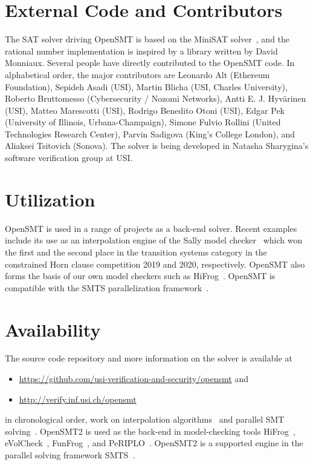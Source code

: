 \documentclass{easychair}
\begin{document}
\section{External Code and Contributors}

The SAT solver driving OpenSMT is based on the MiniSAT
solver~\cite{EenS:SAT03}, and the rational number implementation is
inspired by a library written by David Monniaux.  Several people have
directly contributed to the OpenSMT code.  In alphabetical order, the
major contributors are
%
Leonardo Alt (Ethereum Foundation),
Sepideh Asadi (USI),
Martin Blicha (USI, Charles University),
Roberto Bruttomesso (Cybersecurity / Nozomi Networks),
Antti E. J. Hyv{\"a}rinen (USI),
Matteo Marescotti (USI),
Rodrigo Benedito Otoni (USI),
Edgar Pek (University of Illinois, Urbana-Champaign),
Simone Fulvio Rollini (United Technologies Research Center),
Parvin Sadigova (King's College London), and
Aliaksei Tsitovich (Sonova).
%
The solver is being developed in Natasha Sharygina's software
verification group at USI.

\section{Utilization}

OpenSMT is used in a range of projects as a back-end solver.  Recent
examples include its use as an interpolation engine of the Sally model
checker~\cite{JovanovicD:FMCAD16} which won the first and the second place in the transition systems
category in the constrained Horn clause competition 2019 and 2020, respectively.  OpenSMT also
forms the basis of our own model checkers such as
HiFrog~\cite{AltACMFHS17}.  OpenSMT is compatible with the SMTS
parallelization framework~\cite{MarescottiHS18}.

\section{Availability}
The source code repository and more information on the solver is
available at

\begin{itemize}
    \item \url{https://github.com/usi-verification-and-security/opensmt}
        and
    \item \url{http://verify.inf.usi.ch/opensmt}
\end{itemize}

\iffalse
in chronological order, work on interpolation 
algorithms~\cite{BlichaHKS19,AltHAS17,JancikAFHKS16,AsadiBFHESC18}
and parallel SMT 
solving~\cite{HyvarinenMSCS18,MarescottiHS18,HyvarinenMS:SAT15}.
OpenSMT2 is
used as the back-end in model-checking tools
HiFrog~\cite{AltACMFHS17},
eVolCheck~\cite{FSS_TACAS13}, 
FunFrog~\cite{SFS_ATVA12}, and
PeRIPLO~\cite{RolliniAFHS:LPAR2013,AltFHS:VSTTE2015}.
OpenSMT2 is a supported engine in the parallel 
solving framework SMTS~\cite{MarescottiHS16}.
\end{document}
